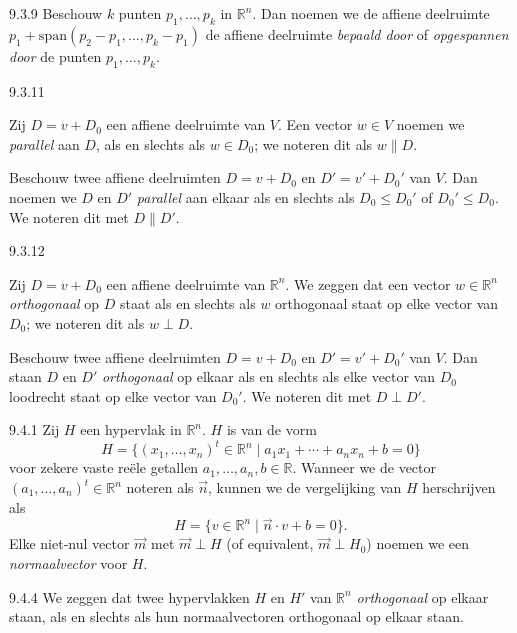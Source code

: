 \begin{res}{9.3.9}
Beschouw $k$ punten $p_1,\dots,p_k$ in $\mathbb R^n$. Dan noemen we de affiene deelruimte $p_1+\mathrm{span}(p_2-p_1,\dots,p_k-p_1)$ de affiene deelruimte \textit{bepaald door} of \textit{opgespannen door} de punten $p_1,\dots,p_k$.
\end{res}

\begin{res}{9.3.11}
\begin{myenum}
\item Zij $D=v+D_0$ een affiene deelruimte van $V$. Een vector $w\in V$ noemen we \textit{parallel} aan $D$, als en slechts als $w\in D_0$; we noteren dit als $w\parallel D$.
\item Beschouw twee affiene deelruimten $D=v+D_0$ en $D'=v'+D_0'$ van $V$. Dan noemen we $D$ en $D'$ \textit{parallel} aan elkaar als en slechts als $D_0\le D_0'$ of $D_0'\le D_0$. We noteren dit met $D\parallel D'$.
\end{myenum}
\end{res}

\begin{res}{9.3.12}
\begin{myenum}
\item Zij $D=v+D_0$ een affiene deelruimte van $\mathbb R^n$. We zeggen dat een vector $w\in\mathbb R^n$ \textit{orthogonaal} op $D$ staat als en slechts als $w$ orthogonaal staat op elke vector van $D_0$; we noteren dit als $w\perp D$.
\item Beschouw twee affiene deelruimten $D=v+D_0$ en $D'=v'+D_0'$ van $V$. Dan staan $D$ en $D'$ \textit{orthogonaal} op elkaar als en slechts als elke vector van $D_0$ loodrecht staat op elke vector van $D_0'$. We noteren dit met $D\perp D'$.
\end{myenum}
\end{res}

\begin{res}{9.4.1}
Zij $H$ een hypervlak in $\mathbb R^n$. $H$ is van de vorm
\[
H=\{(x_1,\dots,x_n)^t\in\mathbb R^n \mid a_1x_1+\cdots+a_nx_n+b=0\}
\]
voor zekere vaste re\"ele getallen $a_1,\dots,a_n,b\in\mathbb R$. Wanneer we de vector $(a_1,\dots,a_n)^t\in\mathbb R^n$ noteren als $\vec n$, kunnen we de vergelijking van $H$ herschrijven als
\[
H=\{v\in\mathbb R^n \mid \vec n\cdot v+b=0\}.
\]
Elke niet-nul vector $\vec m$ met $\vec m\perp H$ (of equivalent, $\vec m\perp H_0$) noemen we een \textit{normaalvector} voor $H$.
\end{res}

\begin{res}{9.4.4}
We zeggen dat twee hypervlakken $H$ en $H'$ van $\mathbb R^n$ \textit{orthogonaal} op elkaar staan, als en slechts als hun normaalvectoren orthogonaal op elkaar staan.
\end{res}

